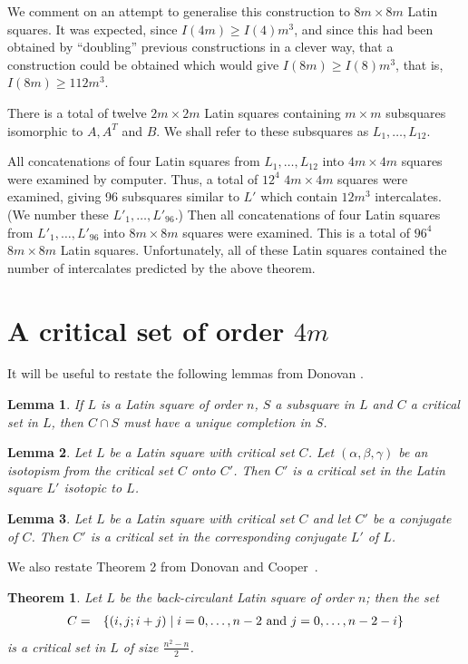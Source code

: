 \documentclass[12pt]{report}
\newtheorem{theorem}{Theorem}
\newtheorem{lemma}{Lemma}
\begin{document}
We comment on an attempt to generalise this construction to $8m \times 8m$
Latin squares.  It was expected, since $I(4m) \geq I(4) m^3$, and since
this had been obtained by ``doubling'' previous constructions in
a clever way, that a construction could be obtained which would give
$I(8m) \geq I(8) m^3$, that is, $I(8m) \geq 112 m^3$.

There is a total of twelve $2m \times 2m$ Latin squares containing
$m \times m$ subsquares isomorphic to $A, A^T$ and $B$.  We shall
refer to these subsquares as $L_1, \dots, L_{12}$.  

All concatenations of four Latin squares from $L_1, \dots, L_{12}$ into
$4m \times 4m$ squares were examined by computer.
Thus, a total of $12^4$ $4m \times 4m$ squares were examined,
giving 96 subsquares similar to $L'$ which contain $12m^3$ intercalates.
(We number these $L'_1, \dots, L'_{96}$.)
Then all concatenations of four Latin squares from $L'_1, \dots, L'_{96}$ into $8m
\times 8m$ squares were examined.  This is a total of $96^4$ $8m \times
8m$ Latin squares.  Unfortunately, all of these Latin squares contained the
number of intercalates predicted by the above theorem.

\section{A critical set of order $4m$}
It will be useful to restate the following lemmas
from Donovan \cite{MR99a:05018}.

\begin{lemma}
\label{lem1}
If $L$ is a Latin square of order $n$, $S$ a subsquare in $L$ and $C$
a critical set in $L$, then $C \cap S$ must have a unique completion in $S$.
\end{lemma}

\begin{lemma}
\label{lem2}
Let $L$ be a Latin square with critical set $C$.  Let $(\alpha, \beta, \gamma)$
be an isotopism from the critical set $C$ onto $C'$.  Then $C'$ is a critical
set in the Latin square $L'$ isotopic to $L$.
\end{lemma}

\begin{lemma}
\label{lem3}
Let $L$ be a Latin square with critical set $C$ and let $C'$ be a 
conjugate of $C$.  Then $C'$ is a critical set in the corresponding
conjugate $L'$ of $L$.
\end{lemma}

We also restate Theorem 2 from Donovan and Cooper~\cite{MR97g:05032}.
\begin{theorem}
\label{thm1}
Let $L$ be the back-circulant Latin square of order $n$; then the set
\begin{eqnarray*}
C &=& \{ (i,j; i+j) \mid i = 0, \dots, n-2 {\rm~and~} j = 0, \dots, n-2-i \}
\end{eqnarray*}
is a critical set in $L$ of size $\displaystyle{\frac{n^2-n}{2}}$.
\end{theorem}
\end{document}
